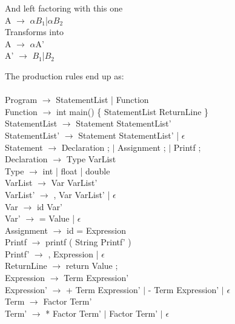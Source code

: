 \documentclass[letterpaper,12pt,oneside]{article}
\begin{document}
And left factoring with this one\\
A $\rightarrow$ $\alpha$$B_1$|$\alpha$$B_2$\\
Transforms into \\
A $\rightarrow$ $\alpha$A'\\
A' $\rightarrow$ $B_1$|$B_2$\\

\noindent

The production rules end up as:\\\\
Program $\rightarrow$ StatementList | Function \\
Function $\rightarrow$ int main() \{ StatementList ReturnLine \} \\
StatementList $\rightarrow$ Statement StatementList' \\
StatementList' $\rightarrow$ Statement StatementList' | $\epsilon$ \\
Statement $\rightarrow$ Declaration ; $|$ \hspace{0.5cm} Assignment ; $|$ \hspace{0.5cm} Printf ; \\
Declaration $\rightarrow$ Type VarList \\
Type $\rightarrow$ int | float | double \\
VarList $\rightarrow$ Var VarList' \\
VarList' $\rightarrow$ , Var VarList' | $\epsilon$ \\
Var $\rightarrow$ id Var' \\
Var' $\rightarrow$ = Value | $\epsilon$ \\
Assignment $\rightarrow$ id = Expression \\
Printf $\rightarrow$ printf ( String Printf' ) \\
Printf' $\rightarrow$ , Expression | $\epsilon$ \\
ReturnLine $\rightarrow$ return Value ; \\
Expression $\rightarrow$ Term Expression' \\
Expression' $\rightarrow$ + Term Expression' $|$ \hspace{0.5cm} - Term Expression' $|$ \hspace{0.5cm} $\epsilon$ \\
Term $\rightarrow$ Factor Term' \\
Term' $\rightarrow$ * Factor Term' $|$ \hspace{0.5cm} Factor Term' $|$ \hspace{0.5cm} $\epsilon$ \\
\end{document}
